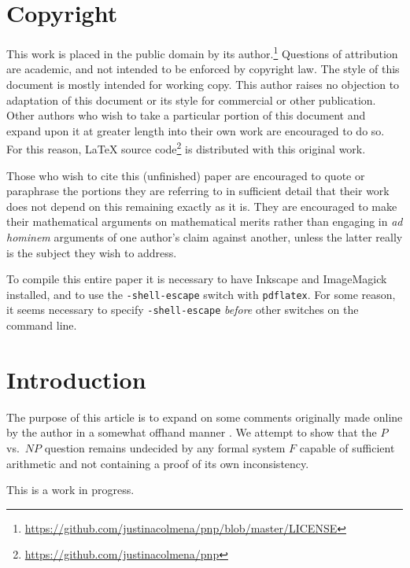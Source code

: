 \documentclass[letterpaper]{article}
\begin{document}
\section{Copyright}
This work is placed in the public domain by its author.\footnote{\url{https://github.com/justinacolmena/pnp/blob/master/LICENSE}} Questions of attribution are academic, and not intended to be enforced by copyright law. The style of this document is mostly intended for working copy.  This author raises no objection to adaptation of this document or its style for commercial or other publication.  Other authors who wish to take a particular portion of this document and expand upon it at greater length into their own work are encouraged to do so. For this reason, \LaTeX\textsuperscript{\textregistered} source code\footnote{\url{https://github.com/justinacolmena/pnp}} is distributed with this original work.

Those who wish to cite this (unfinished) paper are encouraged to quote or paraphrase the portions they are referring to in sufficient detail that their work does not depend on this remaining exactly as it is.  They are encouraged to make their mathematical arguments on mathematical merits rather than engaging in \foreignlanguage{latin}{\textit{ad hominem}} arguments of one author's claim against another, unless the latter really is the subject they wish to address.

To compile this entire paper it is necessary to have Inkscape and ImageMagick installed, and to use the \texttt{-shell-escape} switch with \texttt{pdflatex}. For some reason, it seems necessary to specify \texttt{-shell-escape} \textit{before} other switches on the command line.
\section{Introduction}
The purpose of this article is to expand on some comments originally made online by the author in a somewhat offhand manner \cite{myinfo2016,myinfo2016a,annorlunda2016}.  We attempt to show that the $P$ vs.\ $NP$ question remains undecided by any formal system $F$ capable of sufficient arithmetic and not containing a proof of its own inconsistency.

This is a work in progress.
\end{document}
